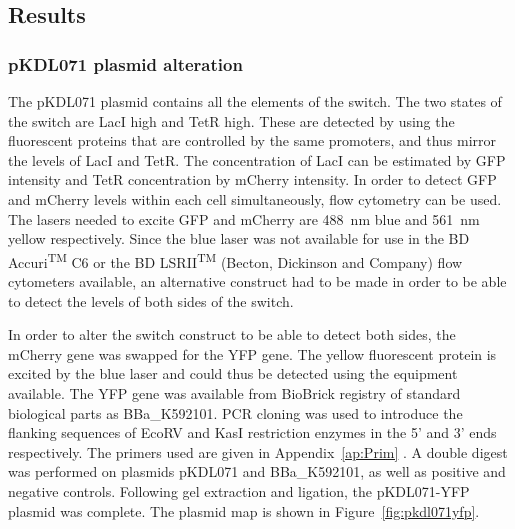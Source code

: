 \subsection{Results}

\subsubsection{pKDL071 plasmid alteration}


The pKDL071 plasmid contains all the elements of the switch. The two states of the switch are LacI high and TetR high. These are detected by using the fluorescent proteins that are controlled by the same promoters, and thus mirror the levels of LacI and TetR. The concentration of LacI can be estimated by GFP intensity and TetR concentration by mCherry intensity. In order to detect GFP and mCherry levels within each cell simultaneously, flow cytometry can be used. The lasers needed to excite GFP and mCherry are \SI{488}{\nano\meter} blue and \SI{561}{\nano\meter} yellow respectively. Since the blue laser was not available for use in the BD Accuri\textsuperscript{TM} C6 or the BD LSRII\textsuperscript{TM} (Becton, Dickinson and Company) flow cytometers available, an alternative construct had to be made in order to be able to detect the levels of both sides of the switch. 

In order to alter the switch construct to be able to detect both sides, the mCherry gene was swapped for the YFP gene. The yellow fluorescent protein is excited by the blue laser and could thus be detected using the equipment available. The YFP gene was available from BioBrick registry of standard biological parts as BBa\_K592101. PCR cloning was used to introduce the flanking sequences of EcoRV and KasI restriction enzymes in the 5' and 3' ends respectively. The primers used are given in Appendix~\ref{ap:Prim} . A double digest was performed on plasmids pKDL071 and BBa\_K592101, as well as positive and negative controls. Following gel extraction and ligation, the pKDL071-YFP plasmid was complete. The plasmid map is shown in Figure~\ref{fig:pkdl071yfp}.

